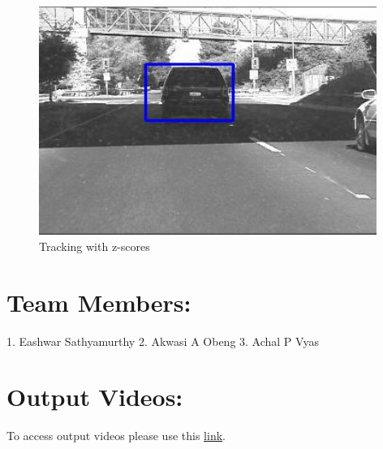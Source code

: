 \documentclass[12pt]{article}
\begin{document}
\begin{figure}[h]
    \centering
    \includegraphics[width=11cm]{trackcar5}
    \caption{Tracking with z-scores}
    \label{fig:Tracking with z-scores}
\end{figure}

\section{Team Members:}
1. Eashwar Sathyamurthy
2. Akwasi A Obeng
3. Achal P Vyas
\section{Output Videos:}
To access output videos please use this \href{https://drive.google.com/drive/folders/1nbAUx-p-eyOWts9neJgAPA8YATY4ekmI?usp=sharing}{\underline{link}}.
\end{document}
